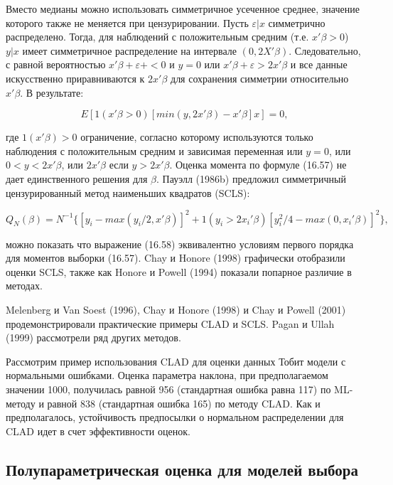 Вместо медианы можно использовать симметричное усеченное среднее, значение которого также не меняется при цензурировании. Пусть $\varepsilon|x$ симметрично распределено. Тогда, для наблюдений с положительным средним (т.е. $x'\beta>0$) $y|x$ имеет симметричное распределение на интервале $(0,2X'\beta)$. Следовательно, с равной вероятностью $x'\beta+\varepsilon+<0$ и $y=0$ или $x'\beta+\varepsilon>2x'\beta$ и все данные искусственно приравниваются к $2x'\beta$ для сохранения симметрии относительно $x'\beta$. В результате:

\begin{equation}
E[1(x'\beta>0)[min(y,2x'\beta)-x'\beta]x]=0,
\end{equation}

где $1(x'\beta)>0$ ограничение, согласно которому используются только наблюдения с положительным средним и зависимая переменная или $y=0$, или $0<y<2x'\beta$, или $2x'\beta$ если $y>2x'\beta$. Оценка момента по формуле (16.57) не дает единственного решения для $\beta$. Пауэлл (1986b) предложил симметричный цензурированный метод наименьших квадратов (SCLS):

\begin{equation}
Q_N(\beta)=N^{-1}\lbrace[y_i-max(y_i/2,x'\beta)]^{2}+1(y_i>2x_i'\beta)[y_i^2/4-max(0,x_i'\beta)]^2\rbrace,
\end{equation}

можно показать что выражение (16.58) эквивалентно условиям первого порядка для моментов выборки (16.57). Chay и Honore (1998) графически отобразили оценки SCLS, также как Honore и Powell (1994) показали попарное различие в методах. 

Melenberg и Van Soest (1996), Chay и Honore (1998) и Chay и Powell (2001) продемонстрировали практические примеры CLAD и SCLS. Pagan и Ullah (1999) рассмотрели ряд других методов.

Рассмотрим пример использования CLAD для оценки данных Тобит модели с нормальными ошибками. Оценка параметра наклона, при предполагаемом значении 1000, получилась равной 956 (стандартная ошибка равна 117) по ML-методу и равной 838 (стандартная ошибка 165) по методу CLAD. Как и предполагалось, устойчивость предпосылки о нормальном распределении для CLAD идет в счет эффективности оценок.

\subsection{Полупараметрическая оценка для моделей выбора}

